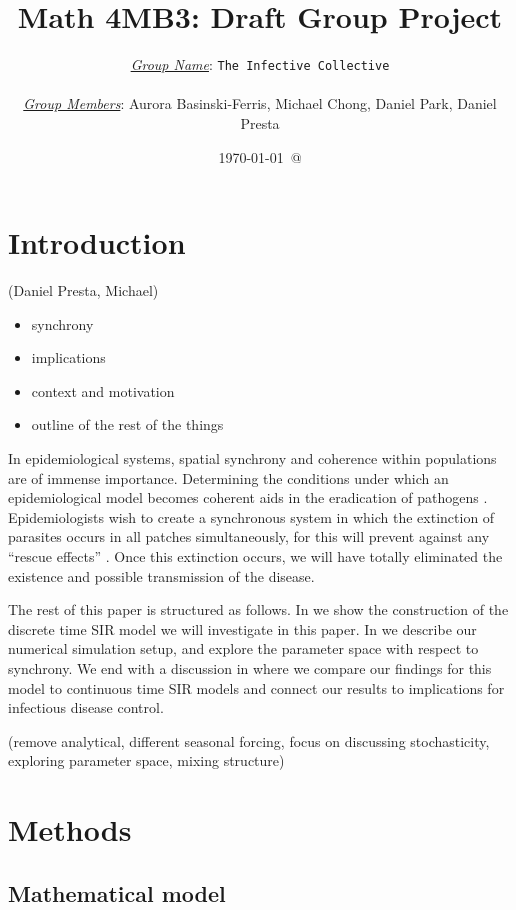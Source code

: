\documentclass[12pt]{article}
\title{Math 4MB3: Draft Group Project}
\author{\underline{\emph{Group Name}}: \texttt{{\color{blue}The Infective Collective}}\\
{}\\
\underline{\emph{Group Members}}: {\color{blue}Aurora Basinski-Ferris, Michael Chong, Daniel Park, Daniel Presta}}
\date{\today\ @ \thistime}
\begin{document}
\maketitle

\section{Introduction}
(Daniel Presta, Michael)

\begin{itemize}
\item synchrony
\item implications
\item context and motivation
\item outline of the rest of the things
\end{itemize}

In epidemiological systems, spatial synchrony and coherence within populations are of immense importance. Determining the conditions under which an epidemiological model becomes coherent aids in the eradication of pathogens \cite{earn1998persistence}. Epidemiologists wish to create a synchronous system in which the extinction of parasites occurs in all patches simultaneously, for this will prevent against any ``rescue effects'' \cite{Earn2000conservation}. Once this extinction occurs, we will have totally eliminated the existence and possible transmission of the disease.

The rest of this paper is structured as follows. In  we show the construction of the discrete time SIR model we will investigate in this paper. In  we describe our numerical simulation setup, and explore the parameter space with respect to synchrony. We end with a discussion in  where we compare our findings for this model to continuous time SIR models and connect our results to implications for infectious disease control.

(remove analytical, different seasonal forcing, focus on discussing stochasticity, exploring parameter space, mixing structure) 

\section{Methods}

\subsection{Mathematical model}
\label{sec:construction}
\end{document}
